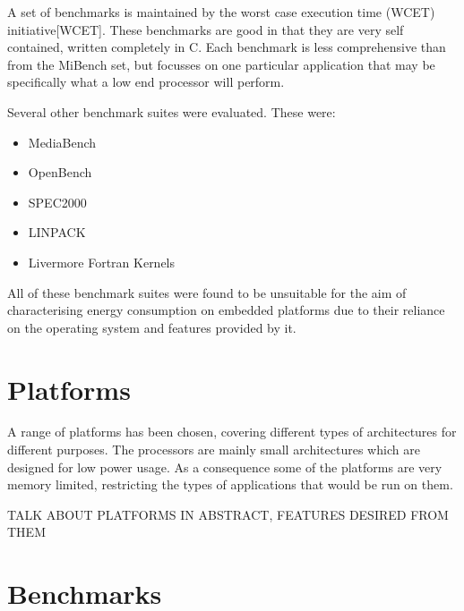 \documentclass[twocolumn]{article}
\newcommand{\nsection}[1]{\section{\bfseries #1}}
\begin{document}
A set of benchmarks is maintained by the worst case execution time (WCET) initiative[WCET]. These benchmarks are good in that they are very self contained, written completely in C. Each benchmark is less comprehensive than from the MiBench set, but focusses on one particular application that may be specifically what a low end processor will perform.

Several other benchmark suites were evaluated. These were:
\begin{itemize}
	\item MediaBench
	\item OpenBench\cite{OpenBench}
	\item SPEC2000\cite{SPEC2000}
	\item LINPACK
	\item Livermore Fortran Kernels
\end{itemize}

All of these benchmark suites were found to be unsuitable for the aim of characterising energy consumption on embedded platforms due to their reliance on the operating system and features provided by it.

\nsection{Platforms}

A range of platforms has been chosen, covering different types of architectures for different purposes. The processors are mainly small architectures which are designed for low power usage. As a consequence some of the platforms are very memory limited, restricting the types of applications that would be run on them.

TALK ABOUT PLATFORMS IN ABSTRACT, FEATURES DESIRED FROM THEM

\nsection{Benchmarks}
\end{document}
